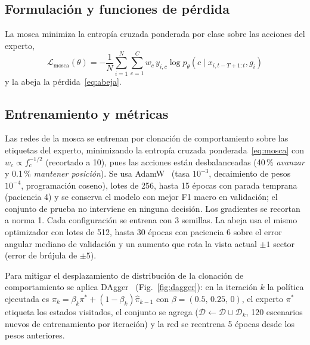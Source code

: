 \subsection{Formulación y funciones de pérdida}
La mosca minimiza la entropía cruzada ponderada por clase sobre las acciones del experto,
\begin{equation}
\mathcal{L}_{\text{mosca}}(\theta) = -\frac{1}{N}\sum_{i=1}^{N}\sum_{c=1}^{C}
w_c\, y_{i,c}\log p_\theta(c \mid x_{i,t-T+1:t}, g_i)
\label{eq:mosca}
\end{equation}
y la abeja la pérdida~\eqref{eq:abeja}.

\subsection{Entrenamiento y métricas}
Las redes de la mosca se entrenan por clonación de comportamiento sobre las etiquetas del
experto, minimizando la entropía cruzada ponderada~\eqref{eq:mosca} con $w_c\propto f_c^{-1/2}$
(recortado a 10), pues las acciones están desbalanceadas (40\,\% \emph{avanzar} y
0.1\,\% \emph{mantener posición}). Se usa AdamW~\cite{loshchilov2019} (tasa $10^{-3}$, decaimiento de pesos
$10^{-4}$, programación coseno), lotes de 256, hasta 15 épocas con parada temprana
(paciencia 4) y se conserva el modelo con mejor F1 macro en validación; el conjunto de
prueba no interviene en ninguna decisión. Los gradientes se recortan a norma 1. Cada
configuración se entrena con 3 semillas. La abeja usa el mismo optimizador con lotes de 512,
hasta 30 épocas con paciencia 6 sobre el error angular mediano de validación y un aumento que
rota la vista actual $\pm1$ sector (error de brújula de $\pm5$\textdegree).

Para mitigar el desplazamiento de distribución de la clonación de comportamiento se
aplica DAgger~\cite{ross2011} (Fig.~\ref{fig:dagger}): en la iteración $k$ la política
ejecutada es $\pi_k=\beta_k\pi^*+(1-\beta_k)\hat\pi_{k-1}$ con
$\beta=(0.5,\,0.25,\,0)$, el experto $\pi^*$ etiqueta los estados visitados, el conjunto
se agrega ($\mathcal D\leftarrow\mathcal D\cup\mathcal D_k$, 120 escenarios nuevos de
entrenamiento por iteración) y la red se reentrena 5 épocas desde los pesos anteriores.

